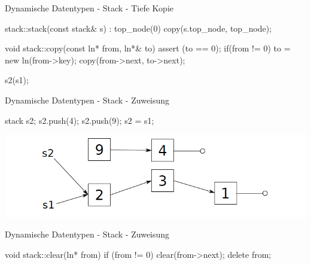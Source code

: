 \ifnum\conditionmacro=1 \documentclass[handout,usenames,dvipsnames]{beamer}\fi
\begin{document}
\begin{frame}[fragile]{Dynamische Datentypen - Stack - Tiefe Kopie}
\begin{TFCpp}
stack::stack(const stack& s) : top_node(0) {
	copy(s.top_node, top_node);
}

void stack::copy(const ln* from, ln*& to){
	assert (to == 0);
	if(from != 0){
		to = new ln(from->key);
		copy(from->next, to->next);
	}
}
\end{TFCpp}

\begin{TPCpp}
s2(s1);
\end{TPCpp}

\end{frame}


\begin{frame}[fragile]{Dynamische Datentypen - Stack - Zuweisung}
\begin{TPCpp}
stack s2;
s2.push(4);
s2.push(9);
s2 = s1;
\end{TPCpp}


\begin{center}
\includegraphics[width=0.9\linewidth]{Pictures/Stack2}
\end{center}
\end{frame}


\begin{frame}[fragile]{Dynamische Datentypen - Stack - Zuweisung}
\begin{TFCpp}
void stack::clear(ln* from){
	if (from != 0){
		clear(from->next);
		delete from;
	}
}
\end{TFCpp}
\end{frame}
\end{document}
